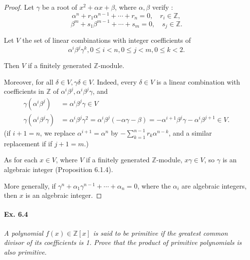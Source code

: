 \documentclass[11pt,a4paper]{article}
\newcommand{\Z}{\mathbb{Z}}
\begin{document}
\begin{proof}

Let $\gamma$  be a root of  $x^2 + \alpha x + \beta$, where $\alpha, \beta$ verify :
$$\alpha^n + r_1 \alpha^{n-1}+ \cdots + r_n = 0,\quad r_i \in \mathbb{Z},$$
$$\beta^m + s_1 \beta^{m-1}+ \cdots + s_m= 0,\quad  s_j \in \mathbb{Z}.$$

Let $V$ the set of linear combinations with integer coefficients of 
$$\alpha^i \beta^j \gamma^k, 0\leq i <n,0 \leq j <m,0 \leq k <2.$$

Then $V$ if a finitely generated $\Z$-module. 

Moreover, for all  $\delta \in V, \gamma \delta \in V$. Indeed, every $\delta \in V$ is a linear combination with coefficients in $\Z$ of $\alpha^i \beta^j, \alpha^i \beta^j \gamma$, and
 \begin{align*}
 \gamma (\alpha^i \beta^j) &= \alpha^i \beta^j \gamma \in V\\
 \gamma(\alpha^i \beta^j \gamma) &= \alpha^i \beta ^j \gamma^2 = \alpha^i \beta^j (-\alpha \gamma - \beta) = - \alpha ^{i+1} \beta^j \gamma - \alpha^i \beta^{j+1} \in V.
 \end{align*}
 (if $i+1 = n$, we replace $\alpha^{i+1} = \alpha^n$ by $ -\sum\limits_{k=1}^{n-1} r_k \alpha^{n-k}$, and a similar replacement if if $j+1 = m$.)
 
 As for each $x\in V$, where $V$ if a finitely generated $\Z$-module, $x \gamma \in V$, so  $\gamma$ is an algebraic integer (Proposition 6.1.4).

More generally,  if  $\gamma^n + \alpha_1 \gamma^{n-1}+ \cdots + \alpha_n = 0$, where the $\alpha_i$ are algebraic integers, then  $x$ is an algebraic integer.
\end{proof}

\paragraph{Ex. 6.4}

{\it A polynomial $f(x) \in \Z[x]$ is said to be primitive if the greatest common divisor of its coefficients is 1. Prove that the product of primitive polynomials is also primitive.}

\bigskip
\end{document}
